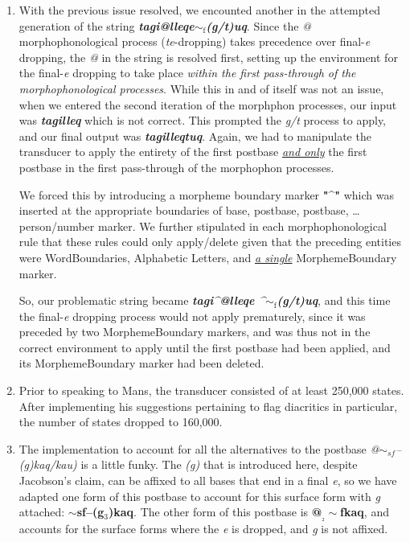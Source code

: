 \documentclass{article}
\begin{document}
\begin{enumerate}
\item With the previous issue resolved, we encounted another in the attempted generation of the string \textit{\textbf{tagi@lleqe${\sim}_\text{f}$(g/t)uq}}. Since the \textit{@} morphophonological process (\textit{te}-dropping) takes precedence over final-\textit{e} dropping, the \textit{@} in the string is resolved first, setting up the environment for the final-\textit{e} dropping to take place \textit{within the first pass-through of the morphophonological processes}. While this in and of itself was not an issue, when we entered the second iteration of the morphphon processes, our input was \textit{\textbf{tagilleq}} which is not correct. This prompted the \textit{g/t} process to apply, and our final output was \textit{\textbf{tagilleqtuq}}. Again, we had to manipulate the transducer to apply the entirety of the first postbase \textit{\uline{and only}} the first postbase in the first pass-through of the morphophon processes.

We forced this by introducing a morpheme boundary marker \textbf{"\textasciicircum"} which was inserted at the appropriate boundaries of base, postbase, postbase, \ldots person/number marker. We further stipulated in each morphophonological rule that these rules could only apply/delete given that the preceding entities were WordBoundaries, Alphabetic Letters, and \textit{\uline{a single}} MorphemeBoundary marker.

So, our problematic string became \textit{\textbf{tagi\textasciicircum @lleqe \textasciicircum ${\sim}_\text{f}$(g/t)uq}}, and this time the final-\textit{e} dropping process would not apply prematurely, since it was preceded by two MorphemeBoundary markers, and was thus not in the correct environment to apply until the first postbase had been applied, and its MorphemeBoundary marker had been deleted.

\item Prior to speaking to Mans, the transducer consisted of at least 250,000 states.
%
After implementing his suggestions pertaining to flag diacritics in particular, the number of states dropped to 160,000.

\item The implementation to account for all the alternatives to the postbase \textit{@$\sim_{sf}$--(g)kaq/kau)} is a little funky.
%
The \textit{(g)} that is introduced here, despite Jacobson's claim, can be affixed to all bases that end in a final \textit{e}, so we have adapted one form of this postbase to account for this surface form with \textit{g} attached: \textbf{$\sim$sf--(g$_\text{3}$)kaq}.
%
The other form of this postbase is \textbf{@$_\text{₂}\sim$fkaq}, and accounts for the surface forms where the \textit{e} is dropped, and \textit{g} is not affixed.


\end{enumerate}
\end{document}

